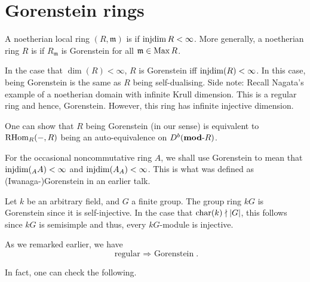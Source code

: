 \documentclass[12pt]{article}
\begin{document}
\section{Gorenstein rings}


\begin{defn}
	A noetherian local ring $(R, \mathfrak{m})$ is  if $\operatorname{injdim} R < \infty$. \newline
	More generally, a noetherian ring $R$ is  if $R_{\mathfrak{m}}$ is Gorenstein for all $\mathfrak{m} \in \operatorname{Max} R$.
\end{defn}

In the case that $\dim(R) < \infty$, $R$ is Gorenstein iff $\operatorname{injdim}(R) < \infty$. In this case, being Gorenstein is the same as $R$ being self-dualising. \newline
Side note: Recall Nagata's example of a noetherian domain with infinite Krull dimension. This is a regular ring and hence, Gorenstein. However, this ring has infinite injective dimension.

\begin{rem}
	One can show that $R$ being Gorenstein (in our sense) is equivalent to $\operatorname{RHom}_{R}(-, R)$ being an auto-equivalence on $D^{b}(\mathbf{mod}\text{-}R)$.
\end{rem}

For the occasional noncommutative ring $A$, we shall use Gorenstein to mean that ${\operatorname{injdim}(_{A}A) < \infty}$ and $\operatorname{injdim}(A_{A}) < \infty$. This is what was defined as (Iwanaga-)Gorenstein in an earlier talk.

\begin{ex}
	Let $k$ be an arbitrary field, and $G$ a finite group. The group ring $kG$ is Gorenstein since it is self-injective. In the case that $\operatorname{char}(k) \nmid {\left\lvert G \right\lvert}$, this follows since $kG$ is semisimple and thus, every $kG$-module is injective.
\end{ex}

As we remarked earlier, we have
\begin{equation*} 
	\text{regular $\Rightarrow$ Gorenstein}.
\end{equation*}

In fact, one can check the following.
\end{document}
